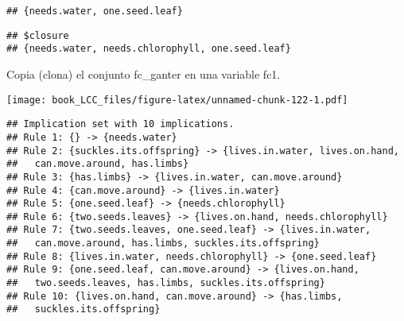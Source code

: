\documentclass[
]{book}
\newenvironment{Shaded}{\begin{snugshade}}{\end{snugshade}}
\newcommand{\FunctionTok}[1]{\textcolor[rgb]{0.00,0.00,0.00}{#1}}
\newcommand{\NormalTok}[1]{#1}
\newcommand{\OtherTok}[1]{\textcolor[rgb]{0.56,0.35,0.01}{#1}}
\newcommand{\SpecialCharTok}[1]{\textcolor[rgb]{0.00,0.00,0.00}{#1}}
\begin{document}
\begin{verbatim}
## {needs.water, one.seed.leaf}
\end{verbatim}

\begin{Shaded}
\end{Shaded}

\begin{verbatim}
## $closure
## {needs.water, needs.chlorophyll, one.seed.leaf}
\end{verbatim}

Copia (clona) el conjunto fc\_ganter en una variable fc1.

\begin{Shaded}
\end{Shaded}

\texttt{[image: book\_LCC\_files/figure-latex/unnamed-chunk-122-1.pdf]}

\begin{Shaded}
\end{Shaded}

\begin{verbatim}
## Implication set with 10 implications.
## Rule 1: {} -> {needs.water}
## Rule 2: {suckles.its.offspring} -> {lives.in.water, lives.on.hand,
##   can.move.around, has.limbs}
## Rule 3: {has.limbs} -> {lives.in.water, can.move.around}
## Rule 4: {can.move.around} -> {lives.in.water}
## Rule 5: {one.seed.leaf} -> {needs.chlorophyll}
## Rule 6: {two.seeds.leaves} -> {lives.on.hand, needs.chlorophyll}
## Rule 7: {two.seeds.leaves, one.seed.leaf} -> {lives.in.water,
##   can.move.around, has.limbs, suckles.its.offspring}
## Rule 8: {lives.in.water, needs.chlorophyll} -> {one.seed.leaf}
## Rule 9: {one.seed.leaf, can.move.around} -> {lives.on.hand,
##   two.seeds.leaves, has.limbs, suckles.its.offspring}
## Rule 10: {lives.on.hand, can.move.around} -> {has.limbs,
##   suckles.its.offspring}
\end{verbatim}
\end{document}
